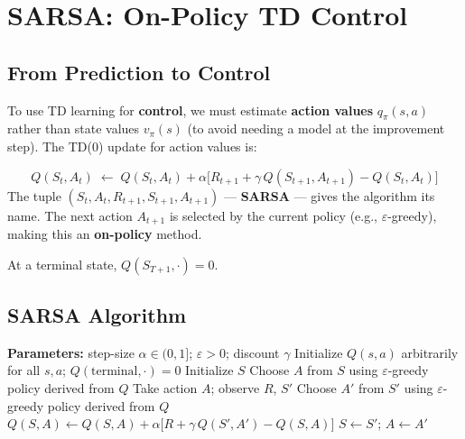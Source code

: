 \documentclass[11pt,a4paper]{article}
\theoremstyle{definition}
\theoremstyle{plain}
\theoremstyle{remark}
\begin{document}
\section{SARSA: On-Policy TD Control}

\subsection{From Prediction to Control}

To use TD learning for \textbf{control}, we must estimate \textbf{action values} $q_\pi(s,a)$ rather than state values $v_\pi(s)$ (to avoid needing a model at the improvement step). The TD(0) update for action values is:

\begin{tcolorbox}[colback=green!5!white, colframe=green!60!black, title={SARSA Update Rule}]
\[
    Q(S_t, A_t) \;\leftarrow\; Q(S_t, A_t) + \alpha\bigl[R_{t+1} + \gamma\, Q(S_{t+1}, A_{t+1}) - Q(S_t, A_t)\bigr]
\]
The tuple $(S_t, A_t, R_{t+1}, S_{t+1}, A_{t+1})$ — \textbf{SARSA} — gives the algorithm its name. The next action $A_{t+1}$ is selected by the current policy (e.g., $\varepsilon$-greedy), making this an \textbf{on-policy} method.
\end{tcolorbox}

At a terminal state, $Q(S_{T+1}, \cdot) = 0$.

\subsection{SARSA Algorithm}

\begin{algorithm}
\caption{SARSA (on-policy TD control), estimating $Q \approx q_*$}
\begin{algorithmic}
\STATE \textbf{Parameters:} step-size $\alpha \in (0,1]$; $\varepsilon > 0$; discount $\gamma$
\STATE Initialize $Q(s, a)$ arbitrarily for all $s, a$; $Q(\text{terminal}, \cdot) = 0$
    \STATE Initialize $S$
    \STATE Choose $A$ from $S$ using $\varepsilon$-greedy policy derived from $Q$
    \REPEAT
        \STATE Take action $A$; observe $R$, $S'$
        \STATE Choose $A'$ from $S'$ using $\varepsilon$-greedy policy derived from $Q$
        \STATE $Q(S, A) \leftarrow Q(S, A) + \alpha\bigl[R + \gamma\, Q(S', A') - Q(S, A)\bigr]$
        \STATE $S \leftarrow S'$; $A \leftarrow A'$
\ENDFOR
\end{algorithmic}
\end{algorithm}
\end{document}

